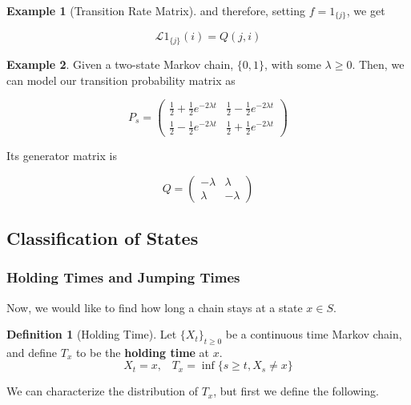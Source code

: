 \documentclass{article}
\theoremstyle{definition}
\newtheorem{example}{Example}[section]
\theoremstyle{remark}
\theoremstyle{definition}
\newtheorem{definition}{Definition}[section]
\begin{document}
\begin{example}[Transition Rate Matrix]
      and therefore, setting $f = 1_{\{j\}}$, we get 

        \[\mathscr{L} 1_{\{j\}} (i) = Q(j, i)\]
    \end{example}

    \begin{example}
      Given a two-state Markov chain, $\{0, 1\}$, with some $\lambda \geq 0$. Then, we can model our transition probability matrix as 

        \[P_s  = \begin{pmatrix} \frac{1}{2} + \frac{1}{2} e^{-2\lambda t} &  \frac{1}{2} - \frac{1}{2} e^{-2\lambda t} \\  \frac{1}{2} - \frac{1}{2} e^{-2\lambda t} &  \frac{1}{2} + \frac{1}{2} e^{-2\lambda t} \end{pmatrix} \]

      Its generator matrix is 

        \[Q = \begin{pmatrix} -\lambda & \lambda \\ \lambda & -\lambda \end{pmatrix}\]
    \end{example}

  \subsection{Classification of States}

    \subsubsection{Holding Times and Jumping Times}

      Now, we would like to find how long a chain stays at a state $x \in S$. 

      \begin{definition}[Holding Time]
        Let $\{X_t\}_{t \geq 0}$ be a continuous time Markov chain, and define $T_x$ to be the \textbf{holding time} at $x$. 
          \[X_t = x, \;\;\; T_x = \inf\{s \geq t, X_s \neq x\} \]
      \end{definition}

      We can characterize the distribution of $T_x$, but first we define the following. 
\end{document}
